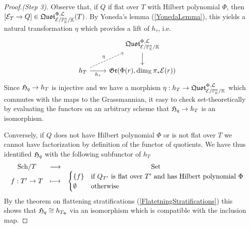 \begin{proof}[Proof.(Step 3)]
Observe that, if $Q$ if flat over $T$ with Hilbert polynomial $\Phi$, then $[\mathcal{E}_T\to Q]\in \mathfrak{Quot}^{\Phi,\mathcal{L}}_{\mathcal{E}/\mathbb{P}^n_{\mathbb{K}}/\mathbb{K}}(T)$. By Yoneda's lemma (\ref{YonedaLemma}), this yields a natural transformation $\eta$ which provides a lift of $h_\tau$, i.e.
\[\begin{tikzcd}
	& {\quotf^{\Phi,\Lc}_{\Ec/\Pj^n_\K/\K}} \\
	{h_T} & {\gr(\Phi(r),\dim_\K\pi_\ast\Ec(r))}
	\arrow[from=1-2, to=2-2]
	\arrow["\eta", dashed, from=2-1, to=1-2]
	\arrow["{h_\tau}"', from=2-1, to=2-2]
\end{tikzcd}\]
Since $\mathfrak{H}_q\to h_T$ is injective and we have a morphism $\eta:h_T\to \mathfrak{Quot}^{\Phi,\mathcal{L}}_{\mathcal{E}/\mathbb{P}^n_{\mathbb{K}}/\mathbb{K}}$ which commutes with the maps to the Grassmannian, it easy to check set-theoretically by evaluating the functors on an arbitrary scheme that $\mathfrak{H}_q\to h_T$ is an isomorphism. 

Conversely, if $Q$ does not have Hilbert polynomial $\Phi$ or is not flat over $T$ we cannot have factorization by definition of the functor of quotients. We have thus identified $\mathfrak{H}_q$ with the following subfunctor of $h_T$
\[\begin{array}{ccc} {{\mathrm{Sch}}/{T}} & \longrightarrow & {\mathrm{Set}}\\ {f:T'\to T} & \longmapsto & {\begin{cases}
\left\{{f}\right\} &\text{if $Q_{T'}$ is flat over $T'$ and has Hilbert polynomial $\Phi$}
\\
\emptyset &\text{otherwise}
\end{cases}} \end{array}\]
By the theorem on flattening stratifications (\ref{FlatetningStratifications}) this shows that $\mathfrak{H}_q\cong h_{T_\Phi}$ via an isomorphism which is compatible with the inclusion map.
\end{proof}